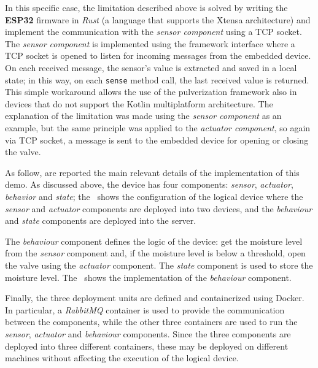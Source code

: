 In this specific case, the limitation described above is solved by writing the \textbf{ESP32} firmware in \emph{Rust} (a language that supports the
Xtensa architecture) and implement the communication with the \emph{sensor component} using a TCP socket. The \emph{sensor component} is
implemented using the framework interface where a TCP socket is opened to listen for incoming messages from the embedded device.
On each received message, the sensor's value is extracted and saved in a local state; in this way, on each \texttt{sense} method call,
the last received value is returned.
This simple workaround allows the use of the pulverization framework also in devices that do not support the Kotlin multiplatform architecture.
The explanation of the limitation was made using the \emph{sensor component} as an example, but the same principle was applied to the
\emph{actuator component}, so again via TCP socket, a message is sent to the embedded device for opening or closing the valve.

As follow, are reported the main relevant details of the implementation of this demo.
As discussed above, the device has four components: \emph{sensor}, \emph{actuator}, \emph{behavior} and \emph{state};
the~ shows the configuration of the logical device where the \emph{sensor} and \emph{actuator} components are
deployed into two devices, and the \emph{behaviour} and \emph{state} components are deployed into the server.



The \emph{behaviour} component defines the logic of the device: get the moisture level from the \emph{sensor} component and, if the moisture level
is below a threshold, open the valve using the \emph{actuator} component. The \emph{state} component is used to store the moisture level.
The~ shows the implementation of the \emph{behaviour} component.



Finally, the three deployment units are defined and containerized using Docker. In particular, a \emph{RabbitMQ} container is used to provide the
communication between the components, while the other three containers are used to run the \emph{sensor}, \emph{actuator} and \emph{behaviour}
components. Since the three components are deployed into three different containers, these may be deployed on different machines without affecting
the execution of the logical device.

